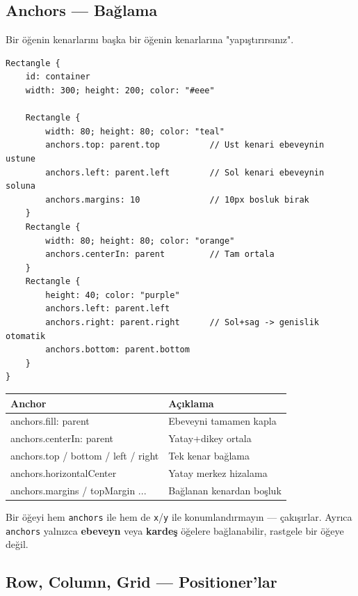 \documentclass[11pt,a4paper]{article}
\newcommand{\kod}[1]{\texttt{\color{koyuGri}#1}}
\begin{document}
\subsection{Anchors — Bağlama}

Bir öğenin kenarlarını başka bir öğenin kenarlarına "yapıştırırsınız".

\begin{lstlisting}
Rectangle {
    id: container
    width: 300; height: 200; color: "#eee"

    Rectangle {
        width: 80; height: 80; color: "teal"
        anchors.top: parent.top          // Ust kenari ebeveynin ustune
        anchors.left: parent.left        // Sol kenari ebeveynin soluna
        anchors.margins: 10              // 10px bosluk birak
    }
    Rectangle {
        width: 80; height: 80; color: "orange"
        anchors.centerIn: parent         // Tam ortala
    }
    Rectangle {
        height: 40; color: "purple"
        anchors.left: parent.left
        anchors.right: parent.right      // Sol+sag -> genislik otomatik
        anchors.bottom: parent.bottom
    }
}
\end{lstlisting}

\begin{center}
\begin{tabularx}{\textwidth}{@{}>{\ttfamily\color{anaMavi}\small}l >{\raggedright\arraybackslash}X@{}}
\toprule
\rowcolor{acikMavi}\color{anaMavi}\textbf{Anchor} & \color{anaMavi}\textbf{Açıklama} \\
\midrule
anchors.fill: parent & Ebeveyni tamamen kapla \\
\rowcolor{acikGri} anchors.centerIn: parent & Yatay+dikey ortala \\
anchors.top / bottom / left / right & Tek kenar bağlama \\
\rowcolor{acikGri} anchors.horizontalCenter & Yatay merkez hizalama \\
anchors.margins / topMargin ... & Bağlanan kenardan boşluk \\
\bottomrule
\end{tabularx}
\end{center}

\begin{uyarikutu}
Bir öğeyi hem \kod{anchors} ile hem de \kod{x}/\kod{y} ile konumlandırmayın —
çakışırlar. Ayrıca \kod{anchors} yalnızca \textbf{ebeveyn} veya \textbf{kardeş}
öğelere bağlanabilir, rastgele bir öğeye değil.
\end{uyarikutu}

\subsection{Row, Column, Grid — Positioner'lar}
\end{document}
